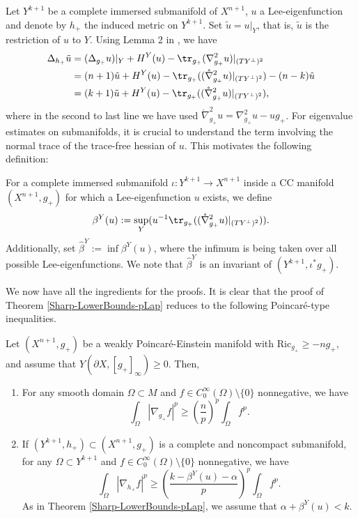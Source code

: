 \documentclass{amsart}
\newcommand{\Ric}{\text{Ric}}
\begin{document}
Let $Y^{k+1}$ be a complete immersed submanifold of $X^{n+1}$, $u$ a Lee-eigenfunction and denote by $h_+$ the induced metric on $Y^{k+1}$. Set $\tilde u = u|_Y$, that is, $\tilde u$ is the restriction of $u$ to $Y$. Using Lemma 2 in \cite{ChoeJaigyoung1992Iiom}, we have
\[
\begin{split}
\Delta_{h_+}\tilde u &= (\Delta_{g_+}u)|_Y + H^Y(u) - \tr_{g_+}(\nabla^2_{g_+}u)|_{(TY^\perp)^2} \\ &= (n+1)\tilde u + H^Y(u) - \tr_{g_+}((\mathring{\nabla}^2_{g_+}u)|_{(TY^\perp)^2}) - (n-k)\tilde u \\&= (k+1)\tilde u + H^Y(u) - \tr_{g_+}((\mathring{\nabla}^2_{g_+}u)|_{(TY^\perp)^2}),
\end{split}
\]
where in the second to last line we have used $\mathring{\nabla}^2_{g_+}u = \nabla^2_{g_+}u - ug_+$. For eigenvalue estimates on submanifolds, it is crucial to understand the term involving the normal trace of the trace-free hessian of $u$. This motivates the following definition:
\begin{definition}\label{Submanifold-Invariant}
    For a complete immersed submanifold $\iota: Y^{k+1}\to X^{n+1}$ inside a CC manifold $(X^{n+1},g_+)$ for which a Lee-eigenfunction $u$ exists, we define \[\beta^Y(u) := \sup_Y(u^{-1}\tr_{g_+}((\mathring{\nabla}^2_{g_+}u)|_{(TY^\perp)^2})).\] Additionally, set $\hat \beta^Y:= \inf \beta^Y(u)$, where the infimum is being taken over all possible Lee-eigenfunctions. We note that $\hat \beta^Y$ is an invariant of $(Y^{k+1},\iota^*g_+)$.
\end{definition}



We now have all the ingredients for the proofs. It is clear that the proof of Theorem \ref{Sharp-LowerBounds-pLap} reduces to the following Poincar\'e-type inequalities. 

\begin{proposition}\label{PoincareTypeInequality}
    Let $(X^{n+1},g_+)$ be a weakly Poincar\'e-Einstein manifold with $\Ric_{g_+}\ge -ng_+$, and assume that $Y(\partial X, [g_+]_\infty)\ge 0$. Then,
    \begin{enumerate}
        \item For any smooth domain $\Omega\subset M$ and $f\in C^\infty_0(\Omega)\setminus\{0\}$ nonnegative, we have 
        \begin{equation}\label{PI-Manifold}
        \int_\Omega |\nabla_{g_+}f|^p \ge \left(\frac{n}{p}\right)^p\int_\Omega f^p.
        \end{equation}
        \item If $(Y^{k+1},h_+)\subset (X^{n+1},g_+)$ is a complete and noncompact submanifold, for any $\Omega\subset Y^{k+1}$ and $f\in C^\infty_0(\Omega)\setminus\{0\}$ nonnegative, we have 
        \begin{equation}\label{PI-SubManifold}
        \int_\Omega |\nabla_{h_+}f|^p \ge \left(\frac{k- \beta^Y(u) - \alpha}{p}\right)^p \int_\Omega f^p.
        \end{equation}
        As in Theorem \ref{Sharp-LowerBounds-pLap}, we assume that $\alpha + \beta^Y(u)<k$.
    \end{enumerate}
\end{proposition}
\end{document}
